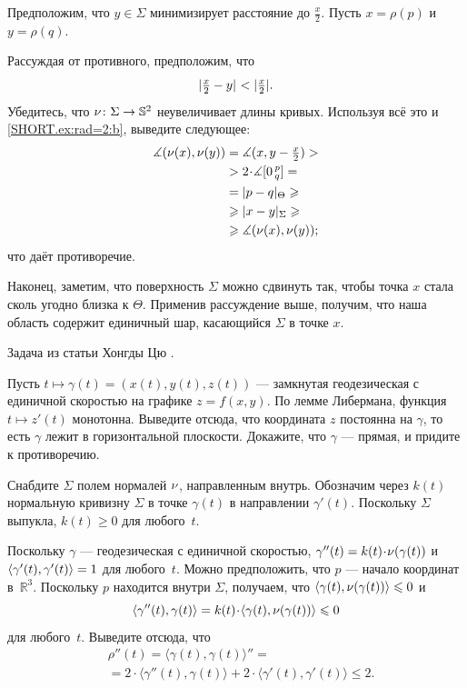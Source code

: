 \begin{multicols}{2}
Предположим, что \( y\in \Sigma \) минимизирует расстояние до \( \tfrac x2 \).
Пусть \( x=\rho(p) \) и \( y=\rho(q) \).

Рассуждая от противного, предположим, что
\[\dist{\tfrac x2}{y}{}\z<|\tfrac x2|.\]
Убедитесь, что \(\nu\colon \Sigma\to \mathbb{S}^2 \) неувеличивает длины кривых.
Используя всё это и \ref{SHORT.ex:rad=2:b}, выведите следующее:
\begin{align*}
\measuredangle(\Norm(x),\Norm(y))&= \measuredangle(x,y-\tfrac x2)>
\\
&>2\cdot\measuredangle\hinge 0pq=
\\
&=\dist{p}{q}{\Theta}\ge
\\
&\ge\dist{x}{y}{\Sigma}\ge
\\
&\ge\measuredangle(\Norm(x),\Norm(y));
\end{align*}
что даёт противоречие.

Наконец, заметим, что поверхность \( \Sigma \) можно сдвинуть так, чтобы точка \( x \) стала сколь угодно близка к \( \Theta \).
Применив рассуждение выше, получим, что наша область содержит единичный шар, касающийся \(\Sigma\) в точке \(x\).

 Задача из статьи Хонгды Цю \cite{qiu2025}.

Пусть $t\mapsto \gamma(t)=(x(t),y(t),z(t))$ --- замкнутая геодезическая с единичной скоростью на графике $z=f(x,y)$.
По лемме Либермана, функция $t\mapsto z'(t)$ монотонна.
Выведите отсюда, что координата $z$ постоянна на $\gamma$, то есть $\gamma$ лежит в горизонтальной плоскости.
Докажите, что $\gamma$ --- прямая, и придите к противоречию.

Снабдите $\Sigma$ полем нормалей $\nu$, направленным внутрь.
Обозначим через $k(t)$ нормальную кривизну $\Sigma$ в точке $\gamma(t)$ в направлении $\gamma'(t)$.
Поскольку $\Sigma$ выпукла, $k(t)\ge 0$ для любого~$t$.

Поскольку $\gamma$ --- геодезическая с единичной скоростью, $\gamma''(t)=k(t)\cdot\Norm(\gamma(t))$ и $\langle\gamma'(t),\gamma'(t)\rangle\z=1$ для любого~$t$.
Можно предположить, что $p$ --- начало координат в~$\mathbb{R}^3$.
Поскольку $p$ находится внутри $\Sigma$, получаем, что $\langle\gamma(t),\nu(\gamma(t))\rangle\leqslant 0$ и
\[
\langle\gamma''(t),\gamma(t)\rangle=k(t)\cdot \langle\gamma(t),\Norm(\gamma(t))\rangle\le 0
\]
для любого~$t$.
Выведите отсюда, что
\begin{align*}
&\rho''(t)
=\langle\gamma(t),\gamma(t)\rangle''=
\\
&=2\cdot\langle\gamma''(t),\gamma(t)\rangle+2\cdot\langle\gamma'(t),\gamma'(t)\rangle\le 2.
\end{align*}


\end{multicols}
